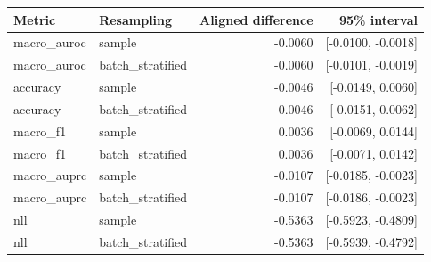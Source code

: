 \begin{tabular}{llrr}
\toprule
Metric & Resampling & Aligned difference & 95\% interval\\
\midrule
macro\_auroc & sample & -0.0060 & [-0.0100, -0.0018]\\
macro\_auroc & batch\_stratified & -0.0060 & [-0.0101, -0.0019]\\
accuracy & sample & -0.0046 & [-0.0149, 0.0060]\\
accuracy & batch\_stratified & -0.0046 & [-0.0151, 0.0062]\\
macro\_f1 & sample & 0.0036 & [-0.0069, 0.0144]\\
macro\_f1 & batch\_stratified & 0.0036 & [-0.0071, 0.0142]\\
macro\_auprc & sample & -0.0107 & [-0.0185, -0.0023]\\
macro\_auprc & batch\_stratified & -0.0107 & [-0.0186, -0.0023]\\
nll & sample & -0.5363 & [-0.5923, -0.4809]\\
nll & batch\_stratified & -0.5363 & [-0.5939, -0.4792]\\
\bottomrule
\end{tabular}
